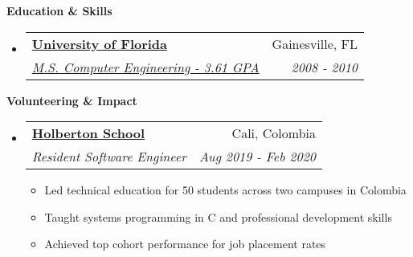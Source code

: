 \documentclass[letterpaper,11pt]{article}
\makeatletter
\newcommand{\resitem}[1]{\item #1 \vspace{-2pt}}
\newcommand{\resheading}[1]{{\large \colorbox{mygrey}{\begin{minipage}{\textwidth}{\textbf{#1 \vphantom{p\^{E}}}}\end{minipage}}}}
\newcommand{\ressubheading}[4]{
\begin{tabular*}{7.0in}{l@{\extracolsep{\fill}}r}
    \textbf{#1} & #2 \\
    \textit{#3} & \textit{#4} \\
\end{tabular*}\vspace{-6pt}}
\makeatother
\begin{document}
\vspace{0.2in}
  
\resheading{Education \& Skills}
\begin{itemize}
\item
    \ressubheading{\href{https://bit.ly/4a2uloZ}{University of Florida}}{Gainesville, FL}{\href{https://bit.ly/4a2uloZ}{M.S. Computer Engineering - 3.61 GPA}}{2008 - 2010}
\end{itemize}

\vspace{0.2in}

\resheading{Volunteering \& Impact}
\begin{itemize}
\item
    \ressubheading{\href{https://www.holbertonschool.com/}{Holberton School}}{Cali, Colombia}{Resident Software Engineer}{Aug 2019 - Feb 2020}
    \begin{itemize}
        \resitem{Led technical education for 50 students across two campuses in Colombia}
        \resitem{Taught systems programming in C and professional development skills}
        \resitem{Achieved top cohort performance for job placement rates}
    \end{itemize}
\end{itemize}
\end{document}
